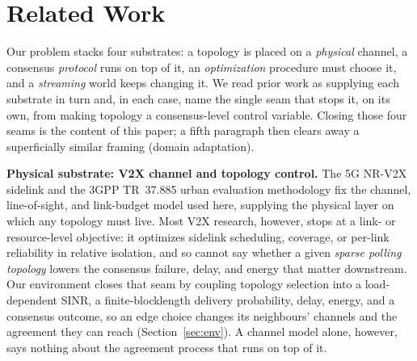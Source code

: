 \documentclass[journal]{IEEEtran}
\begin{document}
\section{Related Work}\label{sec:related}

Our problem stacks four substrates: a topology is placed on a \emph{physical}
channel, a consensus \emph{protocol} runs on top of it, an \emph{optimization}
procedure must choose it, and a \emph{streaming} world keeps changing it. We
read prior work as supplying each substrate in turn and, in each case, name the
single seam that stops it, on its own, from making topology a consensus-level
control variable. Closing those four seams is the content of this paper; a fifth
paragraph then clears away a superficially similar framing (domain adaptation).

\textbf{Physical substrate: V2X channel and topology control.} The 5G NR-V2X
sidelink and the 3GPP TR~37.885 urban evaluation methodology
\cite{PLACEHOLDER_3gpp_37885,PLACEHOLDER_nr_v2x_sidelink} fix the channel,
line-of-sight, and link-budget model used here, supplying the physical layer on
which any topology must live. Most V2X research, however, stops at a link- or
resource-level objective: it optimizes sidelink scheduling, coverage, or
per-link reliability \cite{PLACEHOLDER_v2x_topology_control} in relative
isolation, and so cannot say whether a given \emph{sparse polling topology}
lowers the consensus failure, delay, and energy that matter downstream. Our
environment closes that seam by coupling topology selection into a load-dependent
SINR, a finite-blocklength delivery probability, delay, energy, and a consensus
outcome, so an edge choice changes its neighbours' channels and the agreement
they can reach (Section~\ref{sec:env}). A channel model alone, however, says
nothing about the agreement process that runs on top of it.
\end{document}
